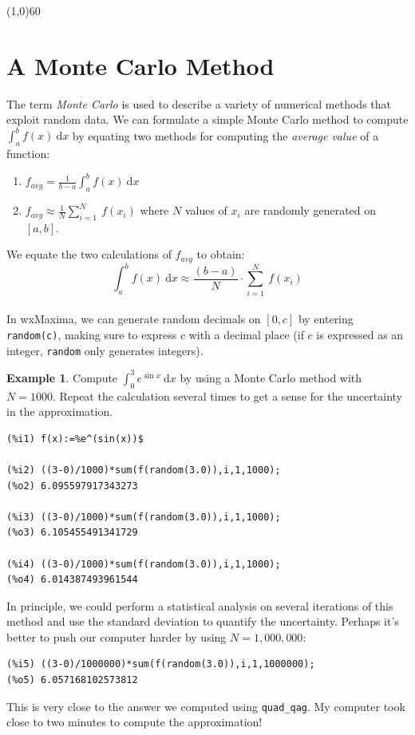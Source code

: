 \documentclass[10.5pt,twoside]{report}
\theoremstyle{definition}
\newtheorem{exmp}{Example}[section]
\begin{document}
\line(1,0){60}
\linethickness{0.5mm}
\pagebreak


\section{A Monte Carlo Method}\label{A Monte Carlo Method}

The term \textit{Monte Carlo} is used to describe a variety of numerical methods that exploit random data.  We can formulate a simple Monte Carlo method to compute $\displaystyle \int_a^b f(x)\ \mathrm{d}x$ by equating two methods for computing the \textit{average value} of a function:\\

\begin{enumerate}

\item $f_{avg}=\displaystyle \frac{1}{b-a} \int_a^b f(x)\ \mathrm{d}x$
\item $f_{avg}\approx \displaystyle \frac{1}{N} \sum_{i=1}^N\ f(x_i)$ where $N$ values of $x_i$ are randomly generated on $[a,b]$.

\end{enumerate}

We equate the two calculations of $f_{avg}$ to obtain:
\[\int_a^b f(x)\ \mathrm{d}x \approx \frac{(b-a)}{N}\cdot \sum_{i=1}^N\ f(x_i)\]\\

In wxMaxima, we can generate random decimals on $[0,c]$ by entering \verb|random(c)|, making sure to express $c$ with a decimal place (if $c$ is expressed as an integer, \verb|random| only generates integers).

\begin{exmp} Compute $\displaystyle \int_0^3 e^{\sin{x}}\ \mathrm{d}x$ by using a Monte Carlo method with $N=1000$.  Repeat the calculation several times to get a sense for the uncertainty in the approximation.

\begin{verbatim}
(%i1) f(x):=%e^(sin(x))$

(%i2) ((3-0)/1000)*sum(f(random(3.0)),i,1,1000);
(%o2) 6.095597917343273

(%i3) ((3-0)/1000)*sum(f(random(3.0)),i,1,1000);
(%o3) 6.105455491341729

(%i4) ((3-0)/1000)*sum(f(random(3.0)),i,1,1000);
(%o4) 6.014387493961544
\end{verbatim}

In principle, we could perform a statistical analysis on several iterations of this method and use the standard deviation to quantify the uncertainty.  Perhaps it's better to push our computer harder by using $N=1,000,000$:

\begin{verbatim}
(%i5) ((3-0)/1000000)*sum(f(random(3.0)),i,1,1000000);
(%o5) 6.057168102573812
\end{verbatim}

This is very close to the answer we computed using \verb|quad_qag|.  My computer took close to two minutes to compute the approximation!

\end{exmp}
\end{document}
